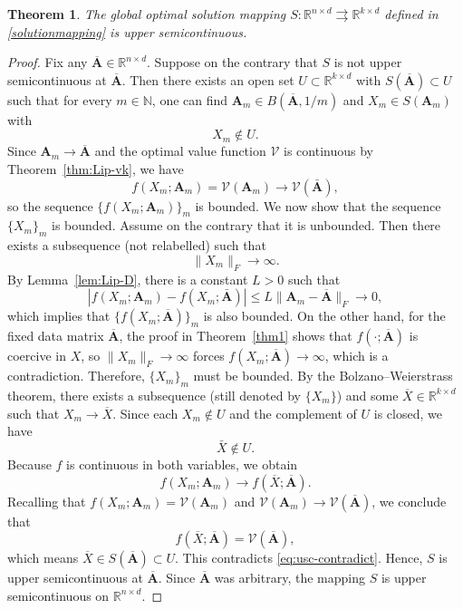 \documentclass[11pt]{article}
\newtheorem{theorem}{Theorem}[section]
\theoremstyle{definition}
\newcommand{\1}{\mathbf{1}}
\def\Bar{\overline}
\begin{document}
\begin{theorem}
The global optimal solution mapping $S: \mathbb{R}^{n \times d} \rightrightarrows \mathbb{R}^{k \times d}$ defined in \eqref{solutionmapping} is upper semicontinuous.
\end{theorem}

\begin{proof}
Fix any $\Bar{\mathbf{A}} \in \mathbb{R}^{n \times d}$. Suppose on the contrary that $S$ is not upper semicontinuous at $\Bar{\mathbf{A}}$. Then there exists an open set $U \subset \mathbb{R}^{k \times d}$ with $S(\Bar{\mathbf{A}}) \subset U$ such that for every $m \in \mathbb{N}$, one can find $\mathbf{A}_m \in B(\Bar{\mathbf{A}}, 1/m)$ and $X_m \in S(\mathbf{A}_m)$ with
\[
X_m \notin U.
\]
Since $\mathbf{A}_m \to \Bar{\mathbf{A}}$ and the optimal value function $\mathcal{V}$ is continuous by Theorem~\ref{thm:Lip-vk}, we have
\[
f(X_m; \mathbf{A}_m) = \mathcal{V}(\mathbf{A}_m) \longrightarrow \mathcal{V}(\bar{\mathbf{A}}),
\]
so the sequence $\{f(X_m; \mathbf{A}_m)\}_m$ is bounded.
We now show that the sequence $\{X_m\}_m$ is bounded. Assume on the contrary that it is unbounded. Then there exists a subsequence (not relabelled) such that $$\|X_m\|_F \to \infty.$$ By Lemma~\ref{lem:Lip-D}, there is a constant $L > 0$ such that
\[
|f(X_m; \mathbf{A}_m) - f(X_m; \bar{\mathbf{A}})| \le L \|\mathbf{A}_m - \Bar{\mathbf{A}}\|_F \longrightarrow 0,
\]
which implies that $\{f(X_m; \Bar{\mathbf{A}})\}_m$ is also bounded. On the other hand, for the fixed data matrix $\Bar{\mathbf{A}}$, the proof in Theorem~\ref{thm1} shows that $f(\cdot; \Bar{\mathbf{A}})$ is coercive in $X$, so $\|X_m\|_F \to \infty$ forces $f(X_m; \Bar{\mathbf{A}}) \to \infty$, which is a contradiction. Therefore, $\{X_m\}_m$ must be bounded. By the Bolzano--Weierstrass theorem, there exists a subsequence (still denoted by $\{X_m\}$) and some $\Bar{X} \in \mathbb{R}^{k \times d}$ such that $X_m \to \Bar{X}$. Since each $X_m \notin U$ and the complement of $U$ is closed, we have
\begin{equation}\label{eq:usc-contradict}
\bar{X} \notin U.
\end{equation}
Because $f$ is continuous in both variables, we obtain
\[
f(X_m; \mathbf{A}_m) \longrightarrow f(\Bar{X}; \Bar{\mathbf{A}}).
\]
Recalling that $f(X_m; \mathbf{A}_m) = \mathcal{V}(\mathbf{A}_m)$ and $\mathcal{V}(\mathbf{A}_m) \to \mathcal{V}(\Bar{\mathbf{A}})$, we conclude that
\[
f(\Bar{X}; \Bar{\mathbf{A}}) = \mathcal{V}(\Bar{\mathbf{A}}),
\]
which means $\Bar{X} \in S(\Bar{\mathbf{A}}) \subset U$. This contradicts \eqref{eq:usc-contradict}. Hence, $S$ is upper semicontinuous at $\Bar{\mathbf{A}}$. Since $\Bar{\mathbf{A}}$ was arbitrary, the mapping $S$ is upper semicontinuous on $\mathbb{R}^{n \times d}$.
\end{proof}
\end{document}
